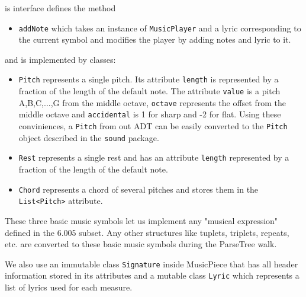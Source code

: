 \documentclass[12pt]{book}
\begin{document}
\smallskip
{} is  interface defines the  method
\begin{itemize} 
\item { \tt addNote} which takes an instance of  {\tt MusicPlayer} and a lyric corresponding to the current symbol and modifies the player by adding notes and lyric to it. 
\end{itemize}
\noindent and is implemented by classes:
\begin{itemize} 
\item { \tt Pitch} represents a single pitch. Its attribute {\tt length} is represented by a fraction  of the length of the default note. The attribute {\tt value} is a pitch A,B,C,...,G from the middle octave,  {\tt octave} represents the offset from the middle octave and  {\tt accidental} is 1 for sharp and -2 for flat. Using these conviniences,  a {\tt Pitch} from out ADT can be easily converted to the {\tt Pitch} object described in the {\tt sound} package.
\item { \tt Rest} represents a single rest and has an attribute {\tt length}  represented by a fraction of the length of the default note. 
\item {\tt Chord} represents a chord of several pitches and stores them in the {\tt List<Pitch>} attribute.
\end{itemize}

\noindent\makebox[\linewidth]{\rule{\textwidth}{0.4pt}}

These three basic music symbols let us implement any "musical expression" defined in the 6.005 subset. Any other structures like tuplets, triplets, repeats, etc. are converted to these basic music symbols during the ParseTree walk.  

We also use an immutable class {\tt Signature} inside MusicPiece that has all header information stored in its attributes and a mutable class {\tt Lyric} which represents a list of lyrics used for each measure.


\noindent\makebox[\linewidth]{\rule{\textwidth}{0.4pt}}
\end{document}
